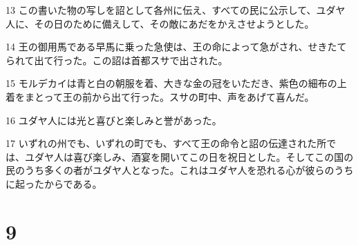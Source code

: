 \par 13 この書いた物の写しを詔として各州に伝え、すべての民に公示して、ユダヤ人に、その日のために備えして、その敵にあだをかえさせようとした。
\par 14 王の御用馬である早馬に乗った急使は、王の命によって急がされ、せきたてられて出て行った。この詔は首都スサで出された。
\par 15 モルデカイは青と白の朝服を着、大きな金の冠をいただき、紫色の細布の上着をまとって王の前から出て行った。スサの町中、声をあげて喜んだ。
\par 16 ユダヤ人には光と喜びと楽しみと誉があった。
\par 17 いずれの州でも、いずれの町でも、すべて王の命令と詔の伝達された所では、ユダヤ人は喜び楽しみ、酒宴を開いてこの日を祝日とした。そしてこの国の民のうち多くの者がユダヤ人となった。これはユダヤ人を恐れる心が彼らのうちに起ったからである。

\chapter{9}

